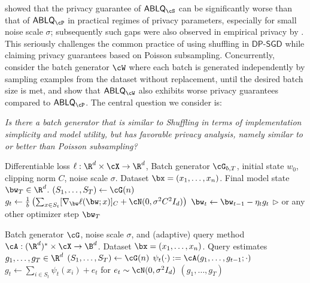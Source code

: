 \documentclass[twoside]{article}
\newcommand{\PARAMETERS}{\STATE \hspace{-3.5mm}{\bf Params:}\xspace}
\theoremstyle{definition}
\newcommand{\prn}[1]{\left ( #1 \right )}
\newcommand{\DPSGD}{\mathsf{DP}\text{-}\mathsf{SGD}}
\newcommand{\ABLQ}{\mathsf{ABLQ}}
\newcommand{\ABLQG}{\ABLQ_{\cG}}
\newcommand{\ABLQP}{\ABLQ_{\cP}}
\newcommand{\ABLQS}{\ABLQ_{\cS}}
\begin{document}
\cite{chua24private} showed that the privacy guarantee of $\ABLQS$ can be significantly worse than that of $\ABLQP$ in practical regimes of privacy parameters, especially for small noise scale $\sigma$; subsequently such gaps were also observed in empirical privacy by \cite{annamalai24shuffle}.
This seriously challenges the common practice of using shuffling in $\DPSGD$  while claiming privacy guarantees based on Poisson subsampling.
Concurrently, \cite{lebeda2024avoiding} consider the batch generator $\cW$ where each batch is generated  independently by sampling examples from the dataset without replacement, until the desired batch size is met, and show that $\ABLQ_{\cW}$ also exhibits worse privacy guarantees compared to $\ABLQP$.
The central question we consider is: 

{\sl
Is there a batch generator that is similar to Shuffling in terms of implementation simplicity and model utility, but has favorable privacy analysis, namely similar to or better than Poisson subsampling?
}

{
\begin{algorithm}[t]
\caption{$\DPSGD_\cG$~\citep{abadi16deep}}
\label{alg:dpsgd}
\begin{algorithmic}
\PARAMETERS
Differentiable loss $\ell : \R^d \times \cX \to \R^d$,
\STATE{} Batch generator $\cG_{b,T}$,
initial state $w_0$,
\STATE{} clipping norm $C$, noise scale $\sigma$.
\REQUIRE Dataset $\bx = (x_1, \ldots, x_n)$.
\ENSURE Final model state $\bw_T \in \R^d$.
\STATE $(S_1, \ldots, S_T) \gets \cG(n)$ \hfill 
{}
\STATE $g_t \gets \frac{1}{b} \prn{\sum_{x \in S_t} [\nabla_{\bw} \ell(\bw; x)]_C + \cN(0, \sigma^2 C^2 I_d)}$
\STATE $\bw_t \gets \bw_{t-1} - \eta_t g_t$ \hfill \textcolor{black!50!Ggreen}{$\triangleright$ or any other optimizer step}
\ENDFOR
\RETURN $\bw_T$
\end{algorithmic}
\end{algorithm}
}

{
\begin{algorithm}[t]
\caption{$\ABLQG$: Adaptive Batch Linear Queries (as formalized in \cite{chua24private})}
\label{alg:ablq}
\begin{algorithmic}
\PARAMETERS Batch generator $\cG$, noise scale $\sigma$, and (adaptive) query method $\cA: (\R^d)^* \times \cX \to \B^d$.
\REQUIRE Dataset $\bx = (x_1, \ldots, x_n)$.
\ENSURE Query estimates $g_1, \ldots, g_T \in \R^d$
\STATE $(S_1, \ldots, S_T) \gets \cG(n)$ \hfill
{}
    \STATE $\psi_t(\cdot) := \cA(g_1, \ldots, g_{t-1}; \cdot)$
    \STATE $g_t \gets \sum_{i \in S_t} \psi_t(x_i) + e_t$ for $e_t \sim \cN(0, \sigma^2 I_d)$
\ENDFOR
\RETURN $(g_1, \ldots, g_T)$
\end{algorithmic}
\end{algorithm}
}
\end{document}
